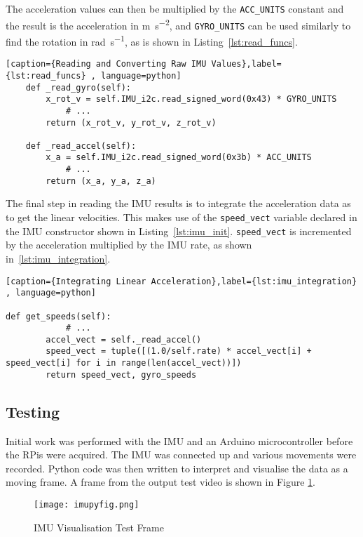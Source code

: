 The acceleration values can then be multiplied by the \verb|ACC_UNITS|
constant and the result is the acceleration in \si{\metre\per\second\squared}, and \verb|GYRO_UNITS|
can be used similarly to find the rotation in \si{\radian\per\second}, as is
shown in Listing~\ref{lst:read_funcs}.


\begin{lstlisting}[caption={Reading and Converting Raw IMU Values},label={lst:read_funcs} , language=python]
    def _read_gyro(self):
        x_rot_v = self.IMU_i2c.read_signed_word(0x43) * GYRO_UNITS
		    # ...
        return (x_rot_v, y_rot_v, z_rot_v)

    def _read_accel(self):
        x_a = self.IMU_i2c.read_signed_word(0x3b) * ACC_UNITS
		    # ...
        return (x_a, y_a, z_a)
\end{lstlisting}

The final step in reading the IMU results is to integrate the acceleration
data as to get the linear velocities. This makes use of the \verb|speed_vect| variable declared in the IMU constructor shown in Listing~\ref{lst:imu_init}. \verb|speed_vect| is incremented by the
acceleration multiplied by the IMU rate, as shown in~\ref{lst:imu_integration}.

\begin{lstlisting}[caption={Integrating Linear Acceleration},label={lst:imu_integration} , language=python]

def get_speeds(self):
		    # ...
        accel_vect = self._read_accel()
        speed_vect = tuple([(1.0/self.rate) * accel_vect[i] + speed_vect[i] for i in range(len(accel_vect))])
        return speed_vect, gyro_speeds
\end{lstlisting}


\subsection{Testing}\label{elec/imu/test}
Initial work was performed with the IMU and an Arduino microcontroller
before the RPis were acquired. The IMU was connected up and various
movements were recorded. Python code was then written to interpret and
visualise the data as a moving frame. A frame from the output test video is shown in Figure \ref{fig:imu_py_test}.

\begin{figure}[!ht]
	\centering
	\texttt{[image: imupyfig.png]}
	\caption{IMU Visualisation Test Frame}\label{fig:imu_py_test}

\end{figure}

